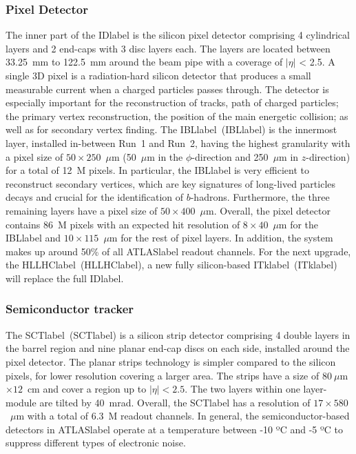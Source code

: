 \subsubsection*{Pixel Detector}

The inner part of the \acrshort{IDlabel} is the silicon pixel detector comprising 4 cylindrical layers and 2 end-caps with 3 disc layers each. The layers are located between 33.25~mm to 122.5~mm around the beam pipe with a coverage of $|\eta|$ < 2.5. A single 3D pixel is a radiation-hard silicon detector that produces a small measurable current when a charged particles passes through. The detector is especially important for the reconstruction of tracks, path of charged particles; the primary vertex reconstruction, the position of the main energetic collision; as well as for secondary vertex finding. The \acrlong{IBLlabel}~(\acrshort{IBLlabel}) is the innermost layer, installed in-between Run~1 and Run~2, having the highest granularity with a pixel size of $50\times 250$~$\mu$m (50~$\mu$m in the $\phi$-direction and 250~$\mu$m in $z$-direction) for a total of 12~M pixels. In particular, the \acrshort{IBLlabel} is very efficient to reconstruct secondary vertices, which are key signatures of long-lived particles decays and crucial for the identification of $b$-hadrons. Furthermore, the three remaining layers have a pixel size of $50\times 400$~$\mu$m. Overall, the pixel detector contains 86~M pixels with an expected hit resolution of $8\times 40$~$\mu$m for the \acrshort{IBLlabel} and $10\times 115$~$\mu$m for the rest of pixel layers. In addition, the system makes up around 50\% of all \acrshort{ATLASlabel} readout channels. For the next upgrade, the \acrlong{HLLHClabel}~(\acrshort{HLLHClabel}), a new fully silicon-based \acrlong{ITklabel}~(\acrshort{ITklabel}) will replace the full \acrshort{IDlabel}.


\subsubsection*{Semiconductor tracker}

The \acrlong{SCTlabel}~(\acrshort{SCTlabel}) is a silicon strip detector comprising 4 double layers in the barrel region and nine planar end-cap discs on each side, installed around the pixel detector. The planar strips technology is simpler compared to the silicon pixels, for lower resolution covering a larger area. The strips have a size of $80~\mu$m$\times 12$~cm and cover a region up to $|\eta|<2.5$. The two layers within one layer-module are tilted by 40~mrad. Overall, the \acrshort{SCTlabel} has a resolution of $17\times 580$~$\mu$m with a total of 6.3~M readout channels. In general, the semiconductor-based detectors in \acrshort{ATLASlabel} operate at a temperature between -10 ºC and -5 ºC to suppress different types of electronic noise.


